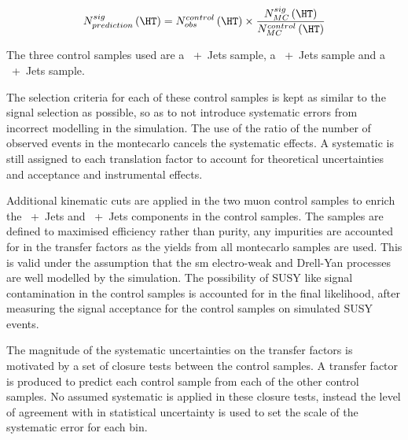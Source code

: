 \begin{equation}
  N^{sig}_{prediction}\left(\HT\right) = N_{obs}^{control}\left(\HT\right) \times \frac{N_{MC}^{sig}\left(\HT\right)}{N_{MC}^{control}\left(\HT\right)}
\label{eq:traslationfactor}
\end{equation}


The three control samples used are a \HepProcess{\PW\to\Pmu\APnu}~+~Jets 
sample, a \HepProcess{\PZ\to\Pmu\Pmu}~+~Jets sample and a 
\HepProcess{\Pphoton}~+~Jets sample.

The selection criteria for each of these control samples is kept as similar to 
the signal selection as possible, so as to not introduce systematic errors from 
incorrect modelling in the simulation. The use of the ratio of the number of 
observed events in the montecarlo cancels the systematic effects. A systematic 
is still assigned to each translation factor to account for theoretical 
uncertainties and acceptance and instrumental effects.

Additional kinematic cuts are applied in the two muon control samples to enrich 
the \HepProcess{\PW}~+~Jets \HepProcess{\Ptop\APtop} and 
\HepProcess{\PZ}~+~Jets components in the control samples. The samples are 
defined to maximised efficiency rather than purity, any impurities are 
accounted for in the transfer factors as the yields from all montecarlo samples 
are used. This is valid under the assumption that the \ac{sm} 
electro-weak and Drell-Yan processes are well modelled by the simulation.
The possibility of SUSY like signal contamination in the control samples is 
accounted for in the final likelihood, after measuring the signal acceptance 
for the control samples on simulated SUSY events.

The magnitude of the systematic uncertainties on the transfer factors is 
motivated by a set of closure tests between the control samples. A transfer 
factor is produced to predict each control sample from each of the other 
control samples. No assumed systematic is applied in these closure tests, 
instead the level of agreement with in statistical uncertainty is used to set 
the scale of the systematic error for each \HT bin.


